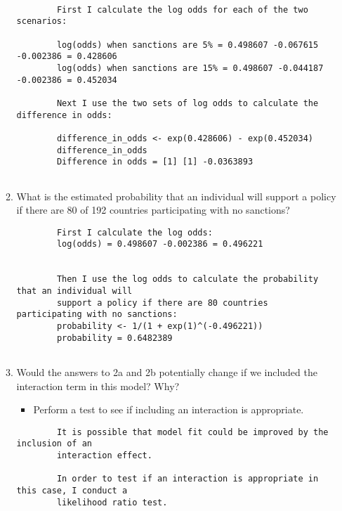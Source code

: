 \documentclass[12pt,letterpaper]{article}
\begin{document}
\begin{enumerate}
\begin{enumerate}
	\begin{verbatim}	
		
		First I calculate the log odds for each of the two scenarios:
		
		log(odds) when sanctions are 5% = 0.498607 -0.067615 -0.002386 = 0.428606
		log(odds) when sanctions are 15% = 0.498607 -0.044187 -0.002386 = 0.452034
		
		Next I use the two sets of log odds to calculate the difference in odds:
		
		difference_in_odds <- exp(0.428606) - exp(0.452034)
		difference_in_odds
		Difference in odds = [1] [1] -0.0363893
	
	\end{verbatim}		
		
		\item
		What is the estimated probability that an individual will support a policy if there are 80 of 192 countries participating with no sanctions? 
		
		\begin{verbatim}	
		First I calculate the log odds:	
		log(odds) = 0.498607 -0.002386 = 0.496221
		
		
		Then I use the log odds to calculate the probability that an individual will
		support a policy if there are 80 countries participating with no sanctions:
		probability <- 1/(1 + exp(1)^(-0.496221))
		probability = 0.6482389
		
		\end{verbatim}		
		
		\item
		Would the answers to 2a and 2b potentially change if we included the interaction term in this model? Why? 
		\begin{itemize}
			\item Perform a test to see if including an interaction is appropriate.
		\end{itemize}
	
		\begin{verbatim}	
		It is possible that model fit could be improved by the inclusion of an
		interaction effect. 
		
		In order to test if an interaction is appropriate in this case, I conduct a
		likelihood ratio test.
		

\end{verbatim}
\end{enumerate}
\end{enumerate}
\end{document}
